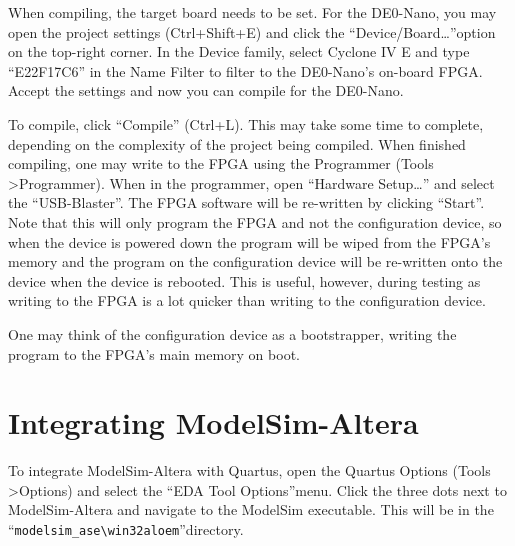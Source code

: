 When compiling, the target board needs to be set. For the DE0-Nano, you may open the project settings (Ctrl+Shift+E) and click the \textquotedblleft Device/Board\dots\textquotedblright  option on the top-right corner. In the Device family, select Cyclone IV E and type ``E22F17C6'' in the Name Filter to filter to the DE0-Nano’s on-board FPGA. Accept the settings and now you can compile for the DE0-Nano.

To compile, click ``Compile'' (Ctrl+L). This may take some time to complete, depending on the complexity of the project being compiled.
When finished compiling, one may write to the FPGA using the Programmer (Tools \textgreater  Programmer). When in the programmer, open ``Hardware Setup\dots'' and select the \textquotedblleft USB-Blaster\textquotedblright. The FPGA software will be re-written by clicking \textquotedblleft Start\textquotedblright. Note that this will only program the FPGA and not the configuration device, so when the device is powered down the program will be wiped from the FPGA’s memory and the program on the configuration device will be re-written onto the device when the device is rebooted. This is useful, however, during testing as writing to the FPGA is a lot quicker than writing to the configuration device.

One may think of the configuration device as a bootstrapper, writing the program to the FPGA's main memory on boot.

\section{Integrating ModelSim-Altera}
To integrate ModelSim-Altera with Quartus, open the Quartus Options (Tools \textgreater Options) and select the \textquotedblleft EDA Tool Options\textquotedblright menu. Click the three dots next to ModelSim-Altera and navigate to the ModelSim executable. This will be in the \textquotedblleft \texttt{modelsim\_ase\textbackslash win32aloem}\textquotedblright directory.
